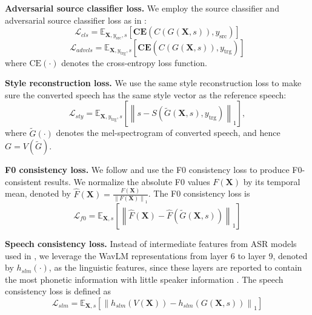 \documentclass{article}
\newcommand{\norm}[1]{\left\lVert#1\right\rVert}
\begin{document}
\begin{sloppy}
    \noindent\textbf{Adversarial source classifier loss.} We employ the source classifier and adversarial source classifier loss as in \cite{li2021starganv2}: 
    \begin{equation}
      \mathcal{L}_{cls} = \mathbb{E}_{\bm{X}, y_{\text{src}}, s}\left[\textbf{CE}(C(G(\bm{X}, s)), y_{\text{src}})\right]
      \label{eq10}
    \end{equation}
    \begin{equation}
      \mathcal{L}_{advcls} = \mathbb{E}_{\bm{X}, y_{\text{trg}}, s}\left[\textbf{CE}(C(G(\bm{X}, s)), y_{\text{trg}})\right]
      \label{eq2}
    \end{equation}
    where $\text{CE}(\cdot)$ denotes the cross-entropy loss function.
    
    \noindent\textbf{Style reconstruction loss.} We use the same style reconstruction loss to make sure the converted speech has the same style vector as the reference speech:
    \begin{equation}
      \mathcal{L}_{sty} = \mathbb{E}_{\bm{X}, y_{\text{trg}}, s}\left[\norm{s - S(\tilde{G}(\bm{X}, s), y_{\text{trg}})}_1\right],
      \label{eq3}
    \end{equation}
    where $\tilde{G}(\cdot)$ denotes the mel-spectrogram of converted speech, and hence $G = V(\tilde{G})$. 
    
    \noindent\textbf{F0 consistency loss.} 
    We follow \cite{li2021starganv2} and use the F0 consistency loss to produce F0-consistent results. We normalize the absolute F0 values $F(\bm{X})$ by its temporal mean, denoted by $\hat{F}(\bm{X}) = \frac{F(\bm{X})}{\norm{F(\bm{X})}_1}$. The F0 consistency loss is
    \begin{equation}
      \mathcal{L}_{f0} = \mathbb{E}_{\bm{X}, s}\left[\norm{\hat{F}(\bm{X}) - \hat{F}(\tilde{G}(\bm{X}, s))}_1\right]
      \label{eq5}
    \end{equation}
    
    \noindent\textbf{Speech consistency loss.} 
    Instead of intermediate features from ASR models used in \cite{li2021starganv2}, we leverage the WavLM representations from layer 6 to layer 9, denoted by $h_{slm}(\cdot)$, as the linguistic features, since these layers are reported to contain the most phonetic information with little speaker information \cite{choi2021neural, pasad2021layer}. The speech consistency loss is defined as
    \begin{equation}
      \mathcal{L}_{slm} = \mathbb{E}_{\bm{X}, s}\left[\norm{h_{slm}(V(\bm{X})) - h_{slm}(G(\bm{X}, s))}_1\right]
      \label{eq6}
    \end{equation}
    

\end{sloppy}
\end{document}
